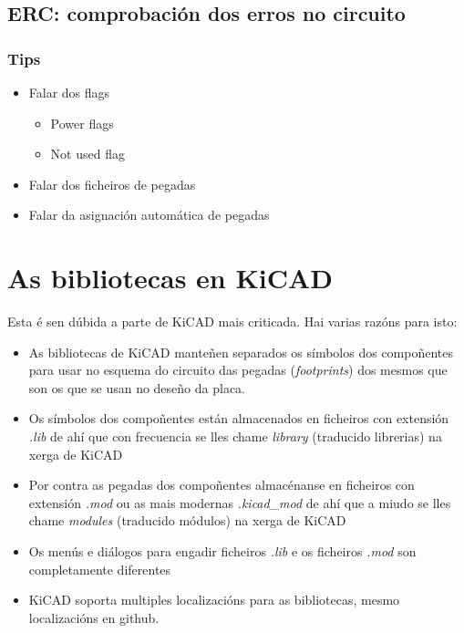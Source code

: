 \documentclass[12pt,galician,]{article}
\providecommand{\tightlist}{%
  \setlength{\itemsep}{0pt}\setlength{\parskip}{0pt}}
\begin{document}
\subsection{ERC: comprobación dos erros no
circuito}\label{erc-comprobaciuxf3n-dos-erros-no-circuito}

\subsubsection{Tips}\label{tips}

\begin{itemize}
\tightlist
\item
  Falar dos flags

  \begin{itemize}
  \tightlist
  \item
    Power flags
  \item
    Not used flag
  \end{itemize}
\item
  Falar dos ficheiros de pegadas
\item
  Falar da asignación automática de pegadas
\end{itemize}

\section{As bibliotecas en KiCAD}\label{as-bibliotecas-en-kicad}

Esta é sen dúbida a parte de KiCAD mais criticada. Hai varias razóns
para isto:

\begin{itemize}
\tightlist
\item
  As bibliotecas de KiCAD manteñen separados os símbolos dos compoñentes
  para usar no esquema do circuito das pegadas (\emph{footprints}) dos
  mesmos que son os que se usan no deseño da placa.
\item
  Os símbolos dos compoñentes están almacenados en ficheiros con
  extensión \emph{.lib} de ahí que con frecuencia se lles chame
  \emph{library} (traducido librerias) na xerga de KiCAD
\item
  Por contra as pegadas dos compoñentes almacénanse en ficheiros con
  extensión \emph{.mod} ou as mais modernas \emph{.kicad\_mod} de ahí
  que a miudo se lles chame \emph{modules} (traducido módulos) na xerga
  de KiCAD
\item
  Os menús e diálogos para engadir ficheiros \emph{.lib} e os ficheiros
  \emph{.mod} son completamente diferentes
\item
  KiCAD soporta multiples localizacións para as bibliotecas, mesmo
  localizacións en github.
\end{itemize}
\end{document}
